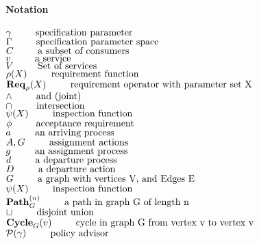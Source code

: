 \documentclass{article}
\newenvironment{notation}
{
    \newpage
    
    \paragraph{\Huge Notation}
    \begin{flushleft}
}
{
    \end{flushleft}
}
\newcommand{\notate}[2]{$#1 \hspace{0.35in} \mbox{#2}$}
\theoremstyle{definition}
\theoremstyle{remark}
\newcommand{\reqop}[2]{\mathbf{Req}_{#1}(#2)}
\newcommand{\path}[2]{\mathbf{Path}^{#2}_{#1}}
\newcommand{\cyclepath}[1]{\mathbf{Cycle}_{#1}}
\begin{document}
	\begin{notation}
		\notate{\gamma}{specification parameter}\\
		\notate{\Gamma}{specification parameter space}\\
		\notate{C}{a subset of consumers}\\
		\notate{v}{a service}\\
		\notate{V}{Set of services}\\
		\notate{\rho(X)}{requirement function}\\
		\notate{\reqop{\rho}{X}}{requirement operator with parameter set X}\\
        \notate{\wedge}{and (joint)}\\
        \notate{\cap}{intersection}\\
        \notate{\psi(X)}{inspection function}\\
        \notate{\phi}{acceptance requirement}\\
		\notate{a}{an arriving process}\\
		\notate{A,G}{assignment actions}\\
		\notate{g}{an assignment process}\\
		\notate{d}{a departure process}\\
		\notate{D}{a departure action}\\
        \notate{G}{a graph with vertices V, and Edges E}\\
        \notate{\psi(X)}{inspection function}\\
        \notate{\path{G}{(n)}}{a path in graph G of length n}\\
        \notate{\sqcup}{disjoint union}\\
        \notate{\cyclepath{G}(v)}{cycle in graph G from vertex v to vertex v}\\
        \notate{\mathcal{P}(\gamma)}{policy advisor}
     \end{notation}

	\newpage
	
\end{document}
